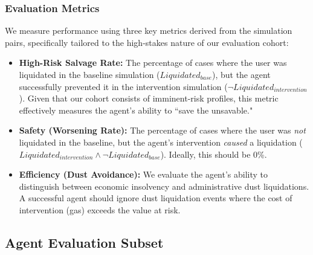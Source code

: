 \documentclass[manuscript,screen,review]{acmart}
\begin{document}
\subsubsection{Evaluation Metrics}
We measure performance using three key metrics derived from the simulation pairs, specifically tailored to the high-stakes nature of our evaluation cohort:
\begin{itemize}
    \item \textbf{High-Risk Salvage Rate:} The percentage of cases where the user was liquidated in the baseline simulation ($Liquidated_{base}$), but the agent successfully prevented it in the intervention simulation ($\neg Liquidated_{intervention}$). Given that our cohort consists of imminent-risk profiles, this metric effectively measures the agent's ability to ``save the unsavable."
    \item \textbf{Safety (Worsening Rate):} The percentage of cases where the user was \textit{not} liquidated in the baseline, but the agent's intervention \textit{caused} a liquidation ($Liquidated_{intervention} \land \neg Liquidated_{base}$). Ideally, this should be 0\%.
    \item \textbf{Efficiency (Dust Avoidance):} We evaluate the agent's ability to distinguish between economic insolvency and administrative dust liquidations. A successful agent should ignore dust liquidation events where the cost of intervention (gas) exceeds the value at risk.
\end{itemize}


\subsection{Agent Evaluation Subset}
\end{document}
